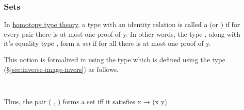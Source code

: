 \subsubsection{Sets}\label{sec:sets}
In \href{https://homotopytypetheory.org}{homotopy type theory}, a type  with an identity relation  is called a  (or ) if for every pair   there is at most one proof of   \ab y. In other words, the type , along with it's equality type , form a \emph{set} if for all   there is at most one proof of   \ab y.

This notion is formalized in \typtop using the type  which is defined using the  type (\S\ref{sec:inverse-image-invers}) as follows.
\ccpad
\begin{code}%
\>[1]\AgdaSpace{}%
\AgdaSymbol{:}\AgdaSpace{}%
\AgdaSpace{}%
\AgdaSpace{}%
\AgdaSpace{}%
\AgdaSpace{}%
\<%
\\
%
\>[1]\AgdaSpace{}%
\AgdaSpace{}%
\AgdaSymbol{=}\AgdaSpace{}%
\AgdaSymbol{(}\AgdaSpace{}%
\AgdaSpace{}%
\AgdaSymbol{:}\AgdaSpace{}%
\AgdaSymbol{)}\AgdaSpace{}%
\AgdaSpace{}%
\AgdaSpace{}%
\AgdaSymbol{(}\AgdaSpace{}%
\AgdaSpace{}%
\AgdaSymbol{)}\<%
\end{code}
\ccpad
Thus, the pair ( , ) forms a set iff it satisfies  \ab x  \as →  (\ab x  \ab y).

